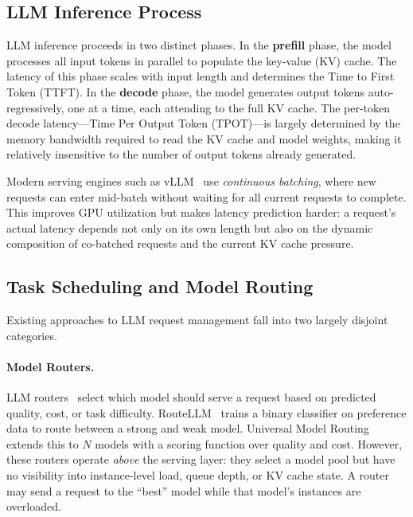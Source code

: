 \documentclass[letterpaper, anonymous, twocolumn, 10pt]{article}
\begin{document}
\subsection{LLM Inference Process} \label{section:llm_inference_processes}

LLM inference proceeds in two distinct phases.
In the \textbf{prefill} phase, the model processes all input tokens in parallel to populate the key-value (KV) cache.
The latency of this phase scales with input length and determines the Time to First Token (TTFT).
In the \textbf{decode} phase, the model generates output tokens auto-regressively, one at a time, each attending to the full KV cache.
The per-token decode latency---Time Per Output Token (TPOT)---is largely determined by the memory bandwidth required to read the KV cache and model weights, making it relatively insensitive to the number of output tokens already generated.

Modern serving engines such as vLLM~\cite{kwon2023vllm} use \emph{continuous batching}, where new requests can enter mid-batch without waiting for all current requests to complete.
This improves GPU utilization but makes latency prediction harder: a request's actual latency depends not only on its own length but also on the dynamic composition of co-batched requests and the current KV cache pressure.

\subsection{Task Scheduling and Model Routing}

Existing approaches to LLM request management fall into two largely disjoint categories.

\paragraph{Model Routers.}
LLM routers~\cite{Ong2024RouteLLMLT, universal_model_routering, chen2023frugalgpthowuse, mei2025eccosefficientcapability} select which model should serve a request based on predicted quality, cost, or task difficulty.
RouteLLM~\cite{Ong2024RouteLLMLT} trains a binary classifier on preference data to route between a strong and weak model.
Universal Model Routing~\cite{universal_model_routering} extends this to $N$ models with a scoring function over quality and cost.
However, these routers operate \emph{above} the serving layer: they select a model pool but have no visibility into instance-level load, queue depth, or KV cache state.
A router may send a request to the ``best'' model while that model's instances are overloaded.
\end{document}

